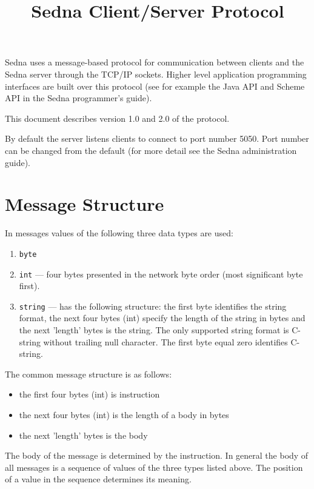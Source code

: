 \documentclass[a4paper,12pt]{article}
\title{Sedna Client/Server Protocol}
\date{}
\newcommand{\TocAt}[6]{}
\begin{document}
\maketitle

\TocAt*{section,subsection,subsubsection}
\TocAt*{subsection,subsubsection}

\tableofcontents


Sedna uses a message-based protocol for communication between clients and the Sedna server through the TCP/IP sockets. Higher level application programming interfaces are built over this protocol (see for example the Java API and Scheme API in the Sedna programmer's guide).

This document describes version 1.0 and 2.0 of the protocol. 

By default the server listens clients to connect to port number 5050. Port number can be changed from the default (for more detail see the Sedna administration guide).


\section{Message Structure}
In messages values of the following three data types are used:
\begin{enumerate}
\item \verb!byte!
\item \verb!int! --- four bytes presented in the network byte order (most significant byte first).
\item \verb!string! --- has the following structure: the first byte identifies the string format, the next four bytes (int) specify the length of the string in bytes and the next 'length' bytes is the string. The only supported string format is C-string without trailing null character. The first byte equal zero identifies C-string. 
\end{enumerate}

The common message structure is as follows:
\begin{itemize} 
\item the first four bytes (int) is instruction 
\item the next four bytes (int) is the length of a body in bytes
\item the next 'length' bytes is the body 
\end{itemize} 

The body of the message is determined by the instruction. In general the body of all messages is a sequence of values of the three types listed above. The position of a value in the sequence determines its meaning. 
\end{document}

